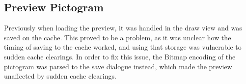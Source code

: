 \subsection{Preview Pictogram}
Previously when loading the preview, it was handled in the draw view and was saved on the cache.
This proved to be a problem, as it was unclear how the timing of saving to the cache worked, and using that storage was vulnerable to sudden cache clearings.
In order to fix this issue, the Bitmap encoding of the pictogram was parsed to the save dialogue instead, which made the preview unaffected by sudden cache clearings.